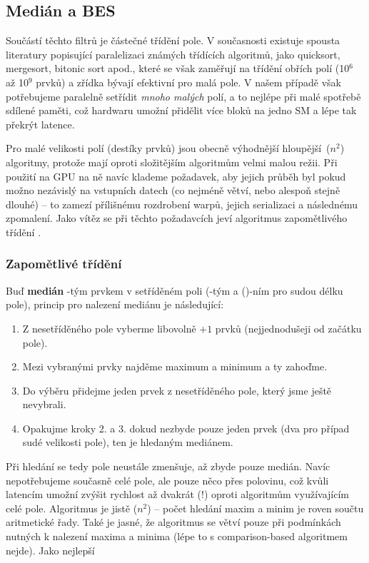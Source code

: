     \subsection{Medián a BES}

    Součástí těchto filtrů je částečné třídění pole. V současnosti existuje spousta literatury popisující paralelizaci známých třídících algoritmů, jako quicksort, mergesort, bitonic sort apod., které se však zaměřují na třídění obřích polí (10$^6$ až 10$^9$ prvků) a zřídka bývají efektivní pro malá pole. V našem případě však potřebujeme paralelně setřídit \emph{mnoho malých} polí, a to nejlépe při malé spotřebě sdílené paměti, což hardwaru umožní přidělit více bloků na jedno SM a lépe tak překrýt latence.

    Pro malé velikosti polí (destíky prvků) jsou obecně výhodnější \bq hloupější\eq ~\OOO($n^2$) algoritmy, protože mají oproti složitějším algoritmům velmi malou režii. Při použití na GPU na ně navíc klademe požadavek, aby jejich průběh byl pokud možno nezávislý na vstupních datech (co nejméně větví, nebo alespoň stejně dlouhé) -- to zamezí přílišnému rozdrobení warpů, jejich serializaci a následnému zpomalení. Jako vítěz se při těchto požadavcích jeví algoritmus zapomětlivého třídění \cite{Forgetful}.

        \subsubsection{Zapomětlivé třídění}

        Buď \textbf{medián} \kk-tým prvkem v setříděném poli (\kk-tým a ()-ním pro sudou délku pole), princip pro nalezení mediánu je následující:
        \begin{enumerate}
          \item Z nesetříděného pole vyberme libovolně \kk$+1$ prvků (nejjednodušeji od začátku pole).
          \item Mezi vybranými prvky najděme maximum a minimum a ty zahoďme.
          \item Do výběru přidejme jeden prvek z nesetříděného pole, který jsme ještě nevybrali.
          \item Opakujme kroky 2. a 3. dokud nezbyde pouze jeden prvek (dva pro případ sudé velikosti pole), ten je hledaným mediánem.
        \end{enumerate}

        Při hledání se tedy pole neustále zmenšuje, až zbyde pouze medián. Navíc nepotřebujeme současně celé pole, ale pouze něco přes polovinu, což kvůli latencím umožní zvýšit rychlost až dvakrát (!) oproti algoritmům využívajícím celé pole. Algoritmus je jistě \OOO($n^2$) -- počet hledání maxim a minim je roven součtu aritmetické řady. Také je jasné, že algoritmus se větví pouze při podmínkách nutných k nalezení maxima a minima (lépe to s comparison-based algoritmem nejde). Jako nejlepší 

